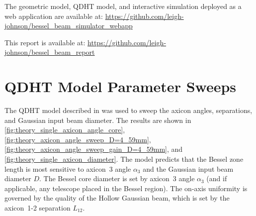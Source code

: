 \documentclass[
  aps,
  twocolumn,
  reprint,              %
  superscriptaddress,
  amsmath,
  amssymb,
  floatfix,
  longbibliography,      %
  nofootinbib %
]{revtex4-2}
\begin{document}
The geometric model, QDHT model, and interactive simulation deployed as a web application are available at: \url{https://github.com/leigh-johnson/bessel_beam_simulator_webapp}

This report is available at: \url{https://github.com/leigh-johnson/bessel_beam_report}



\clearpage
\appendix

\section{QDHT Model Parameter Sweeps}\label{sec:model_parameter_sweeps}
The QDHT model described in  was used to sweep the axicon angles, separations, and Gaussian input beam diameter. The results are shown in \autoref{fig:theory_single_axicon_angle_core}, \autoref{fig:theory_axicon_angle_sweep_D=4_59mm}, \autoref{fig:theory_axicon_angle_sweep_gain_D=4_59mm}, and \autoref{fig:theory_single_axicon_diameter}. The model predicts that the Bessel zone length is most sensitive to axicon~3 angle $\alpha_3$ and the Gaussian input beam diameter $D$. The Bessel core diameter is set by axicon~3 angle $\alpha_3$ (and if applicable, any telescope placed in the Bessel region). The on-axis uniformity is governed by the quality of the Hollow Gaussian beam, which is set by the axicon~1-2 separation $L_{12}$.
\end{document}
